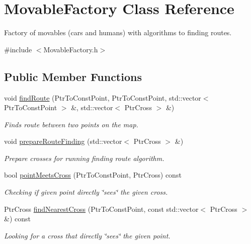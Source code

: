 \hypertarget{classMovableFactory}{\section{Movable\-Factory Class Reference}
\label{classMovableFactory}
}


Factory of movables (cars and humans) with algorithms to finding routes.  




{\ttfamily \#include $<$Movable\-Factory.\-h$>$}

\subsection*{Public Member Functions}
\begin{DoxyCompactItemize}
\item 
void \hyperlink{classMovableFactory_a38bfc032a4e526e24b6dc186cda1382e}{find\-Route} (Ptr\-To\-Const\-Point, Ptr\-To\-Const\-Point, std\-::vector$<$ Ptr\-To\-Const\-Point $>$ \&, std\-::vector$<$ Ptr\-Cross $>$ \&)
\begin{DoxyCompactList}\small\item\em Finds route between two points on the map. \end{DoxyCompactList}\item 
void \hyperlink{classMovableFactory_addc3e4721ec280bafebd41332ef16a54}{prepare\-Route\-Finding} (std\-::vector$<$ Ptr\-Cross $>$ \&)
\begin{DoxyCompactList}\small\item\em Prepare crosses for running finding route algorithm. \end{DoxyCompactList}\item 
bool \hyperlink{classMovableFactory_a9f12c7d5c0cc67b8ad9a58a574b8427c}{point\-Meets\-Cross} (Ptr\-To\-Const\-Point, Ptr\-Cross) const 
\begin{DoxyCompactList}\small\item\em Checking if given point directly \char`\"{}sees\char`\"{} the given cross. \end{DoxyCompactList}\item 
Ptr\-Cross \hyperlink{classMovableFactory_a510b583ce682dec2d4e2988029b0c9ac}{find\-Nearest\-Cross} (Ptr\-To\-Const\-Point, const std\-::vector$<$ Ptr\-Cross $>$ \&) const 
\begin{DoxyCompactList}\small\item\em Looking for a cross that directly \char`\"{}sees\char`\"{} the given point. \end{DoxyCompactList}\item 

\end{DoxyCompactItemize}
